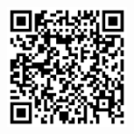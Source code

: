\documentclass[11 pt,oneside,a4paper,titlepage]{article}
\begin{document}
{\begin{minipage}{7.3cm}
        \hfill \break
        \begin{center}
            \includegraphics[width=3.5cm]{gitQR.png}
        \end{center}
       
        \end{minipage}}
        \hfill 
\end{document}
